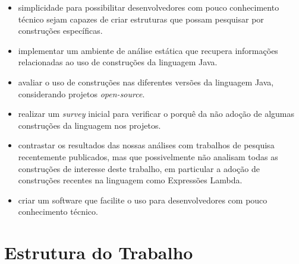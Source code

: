 	\begin{itemize}
		\item simplicidade para possibilitar desenvolvedores com pouco conhecimento técnico sejam capazes de criar estruturas que possam pesquisar por construções específicas.
	
	  \item implementar um ambiente de análise estática que recupera informações relacionadas ao uso  de construções da linguagem Java. 
	  
	  \item avaliar o uso de construções nas diferentes versões da linguagem Java, considerando  projetos \textit{open-source}. 
	  
	  \item realizar um \textit{survey} inicial para verificar o porquê da não adoção de algumas construções da linguagem nos projetos. 
	  
	  \item contrastar os resultados das nossas análises com trabalhos de pesquisa recentemente publicados, mas que possivelmente não analisam todas as construções de interesse deste trabalho, em particular 
	  a adoção de construções recentes na linguagem como Expressões Lambda. 
	  
	  \item criar um software que facilite o uso para desenvolvedores com pouco conhecimento técnico.
	\end{itemize}


\section{Estrutura do Trabalho}


